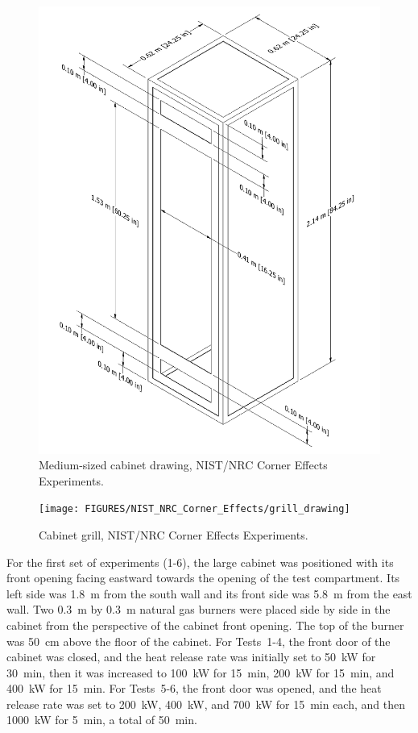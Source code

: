 \begin{figure}[p]
\includegraphics[width=\textwidth]{FIGURES/NIST_NRC_Corner_Effects/Cabinet_2x2x7}
\caption[Medium-sized cabinet drawing, NIST/NRC Corner Effects Experiments]{Medium-sized cabinet drawing, NIST/NRC Corner Effects Experiments.}
\label{Medium_Cabinet}
\end{figure}

\begin{figure}[!ht]
\texttt{[image: FIGURES/NIST\_NRC\_Corner\_Effects/grill\_drawing]}
\caption[Cabinet grill, NIST/NRC Corner Effects Experiments]{Cabinet grill, NIST/NRC Corner Effects Experiments.}
\label{cabinet_grill}
\end{figure}


For the first set of experiments (1-6), the large cabinet was positioned with its front opening facing eastward towards the opening of the test compartment. Its left side was 1.8~m from the south wall and its front side was 5.8~m from the east wall. Two 0.3~m by 0.3~m natural gas burners were placed side by side in the cabinet from the perspective of the cabinet front opening. The top of the burner was 50~cm above the floor of the cabinet. For Tests~1-4, the front door of the cabinet was closed, and the heat release rate was initially set to 50~kW for 30~min, then it was increased to 100~kW for 15~min, 200~kW for 15~min, and 400~kW for 15~min. For Tests~5-6, the front door was opened, and the heat release rate was set to 200~kW, 400~kW, and 700~kW for 15~min each, and then 1000~kW for 5~min, a total of 50~min.

